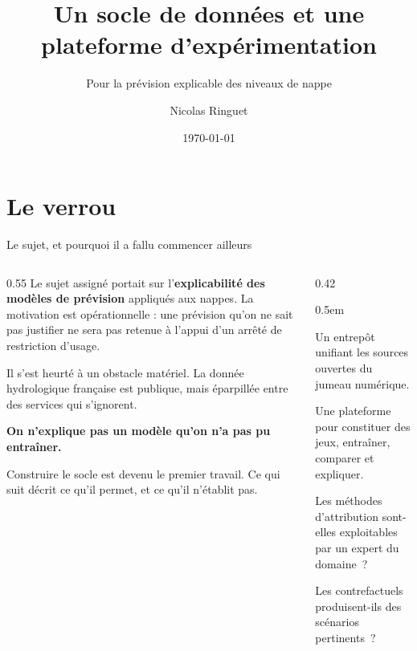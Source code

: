 \documentclass[aspectratio=169,11pt]{beamer}
\title{Un socle de données et une plateforme d'expérimentation}
\subtitle{Pour la prévision explicable des niveaux de nappe}
\author{Nicolas Ringuet}
\date{\today}
\newcommand{\titrecourt}{Socle de données et plateforme \textbullet{} ARD JUNON}
\begin{document}
\renewcommand{\insertshorttitle}{\titrecourt}

\pagetitre
\bandeautrue

\section{Le verrou}
\begin{frame}{Le sujet, et pourquoi il a fallu commencer ailleurs}
\vspace{-2pt}

\begin{columns}[T]
\begin{column}{0.55\textwidth}
\small
Le sujet assigné portait sur l'\textbf{explicabilité des modèles de prévision} appliqués aux
nappes. La motivation est opérationnelle : une prévision qu'on ne sait pas justifier ne sera pas
retenue à l'appui d'un arrêté de restriction d'usage.

\vspace{0.5em}
Il s'est heurté à un obstacle matériel. La donnée hydrologique française est publique, mais
éparpillée entre des services qui s'ignorent.

\vspace{0.4em}
{\color{bleuprofond}\bfseries On n'explique pas un modèle qu'on n'a pas pu entraîner.}

\vspace{0.5em}
Construire le socle est devenu le premier travail. Ce qui suit décrit ce qu'il permet, et ce
qu'il n'établit pas.
\end{column}

\begin{column}{0.42\textwidth}
\vspace{0.3cm}
\small
\begin{description}\itemsep0.5em
  \item[\color{bleuprofond}QT1] Un entrepôt unifiant les sources ouvertes du jumeau numérique.
  \item[\color{bleuprofond}QT2] Une plateforme pour constituer des jeux, entraîner, comparer et
        expliquer.
  \item[\color{bleuprofond}QR1] Les méthodes d'attribution sont-elles exploitables par un
        expert du domaine~?
  \item[\color{bleuprofond}QR2] Les contrefactuels produisent-ils des scénarios pertinents~?
\end{description}
\end{column}
\end{columns}
\end{frame}
\end{document}
